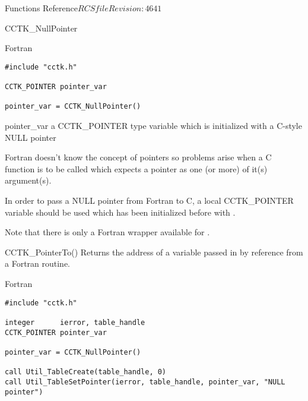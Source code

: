 \begin{cactuspart}{ Functions Reference}{$RCSfile$}{$Revision: 4641 $}
\begin{FunctionDescription}{CCTK\_NullPointer}
\begin{SynopsisSection}
\begin{Synopsis}{Fortran}
\begin{verbatim}
#include "cctk.h"

CCTK_POINTER pointer_var

pointer_var = CCTK_NullPointer()
\end{verbatim}
\end{Synopsis}
\end{SynopsisSection}

\begin{ResultSection}
\begin{Result}{pointer\_var}
a CCTK\_POINTER type variable which is initialized with a C-style NULL pointer
\end{Result}
\end{ResultSection}

\begin{Discussion}
Fortran doesn't know the concept of pointers so problems arise when a C function
is to be called which expects a pointer as one (or more) of it(s) argument(s).

In order to pass a NULL pointer from Fortran to C, a local CCTK\_POINTER variable should be used which has been initialized before with .

Note that there is only a Fortran wrapper available for .
\end{Discussion}

\begin{SeeAlsoSection}
\begin{SeeAlso}{CCTK\_PointerTo()}
Returns the address of a variable passed in by reference from a Fortran routine.
\end{SeeAlso}
\end{SeeAlsoSection}

\begin{ExampleSection}
\begin{Example}{Fortran}
\begin{verbatim}
#include "cctk.h"

integer      ierror, table_handle
CCTK_POINTER pointer_var

pointer_var = CCTK_NullPointer()

call Util_TableCreate(table_handle, 0)
call Util_TableSetPointer(ierror, table_handle, pointer_var, "NULL pointer")
\end{verbatim}
\end{Example}
\end{ExampleSection}
\end{FunctionDescription}




\end{cactuspart}
